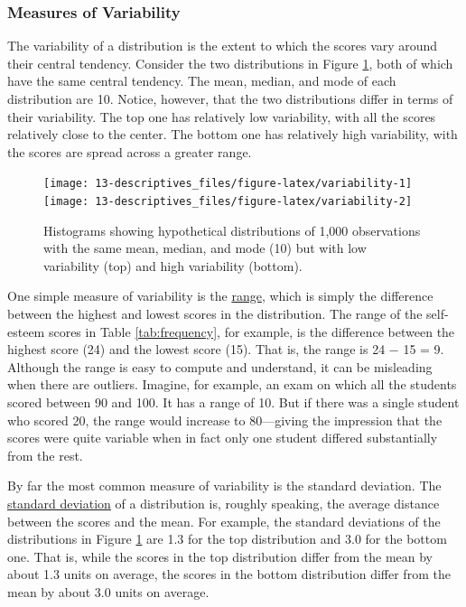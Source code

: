 \documentclass[
]{krantz}
\begin{document}
\hypertarget{measures-of-variability}{%
\subsubsection*{Measures of Variability}\label{measures-of-variability}}


The variability of a distribution is the extent to which the scores vary around their central tendency. Consider the two distributions in Figure \ref{fig:variability}, both of which have the same central tendency. The mean, median, and mode of each distribution are 10. Notice, however, that the two distributions differ in terms of their variability. The top one has relatively low variability, with all the scores relatively close to the center. The bottom one has relatively high variability, with the scores are spread across a greater range.

\begin{figure}

{\centering \texttt{[image: 13-descriptives\_files/figure-latex/variability-1]} \texttt{[image: 13-descriptives\_files/figure-latex/variability-2]} 

}

\caption{Histograms showing hypothetical distributions of 1,000 observations with the same mean, median, and mode (10) but with low variability (top) and high variability (bottom).}\label{fig:variability}
\end{figure}

One simple measure of variability is the \protect\hyperlink{range}{range}, which is simply the difference between the highest and lowest scores in the distribution. The range of the self-esteem scores in Table \ref{tab:frequency}, for example, is the difference between the highest score (24) and the lowest score (15). That is, the range is 24 − 15 = 9. Although the range is easy to compute and understand, it can be misleading when there are outliers. Imagine, for example, an exam on which all the students scored between 90 and 100. It has a range of 10. But if there was a single student who scored 20, the range would increase to 80---giving the impression that the scores were quite variable when in fact only one student differed substantially from the rest.

By far the most common measure of variability is the standard deviation. The \protect\hyperlink{standard-deviation}{standard deviation} of a distribution is, roughly speaking, the average distance between the scores and the mean. For example, the standard deviations of the distributions in Figure \ref{fig:variability} are 1.3 for the top distribution and 3.0 for the bottom one. That is, while the scores in the top distribution differ from the mean by about 1.3 units on average, the scores in the bottom distribution differ from the mean by about 3.0 units on average.
\end{document}
